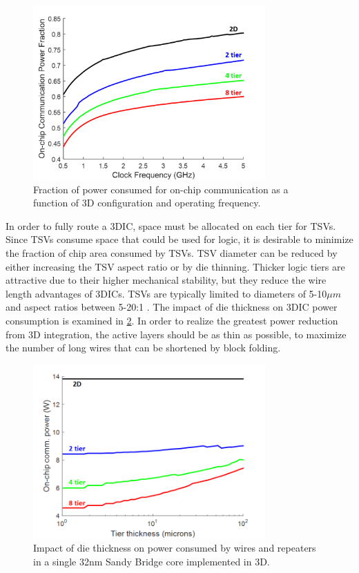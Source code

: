\documentclass[journal,twoside]{IEEEtran}
\newcommand{\rechanged}[1]{\textcolor{red}{#1}}
\renewcommand{\rechanged}[1]{#1} %
\begin{document}
\begin{figure}[tb]
	\centering
	\includegraphics[width=3.5in]{Figures/sb3d_comm_power_fraction_4.png}
	\caption{Fraction of power consumed for on-chip communication as a function of 3D configuration and operating frequency.}
	\label{f-sb-comm-power-fraction}
\end{figure}


In order to fully route a 3DIC, space must be allocated on each tier for TSVs. Since TSVs consume space
that could be used for logic, it is desirable to minimize the fraction of chip area 
consumed by TSVs. TSV diameter can be reduced by either increasing the TSV aspect ratio or by die thinning.
Thicker logic tiers are attractive due to their higher mechanical stability, but they reduce the wire length advantages of 3DICs. 
TSVs are typically limited to diameters of 5-10${\mu}m$ and aspect ratios between 5-20:1 
\cite{lau_evolution_2011,zhang_within-tier_2013}.
%
The impact of die thickness on 3DIC power consumption is examined in \cref{f-sb-wire-power-thickness}.
In order to realize the greatest power reduction from 3D integration, the active layers should be
as thin as possible\rechanged{, to maximize the number of long wires that can be shortened by block folding.}

\begin{figure}[tb]
	\centering
	\includegraphics[width=3.5in]{Figures/sb3d-comm-power-vs-thickness_3.png}
	\caption{Impact of die thickness on power consumed by wires and repeaters in a single 32nm Sandy Bridge core implemented in 3D.}
	\label{f-sb-wire-power-thickness}
\end{figure}
\end{document}
